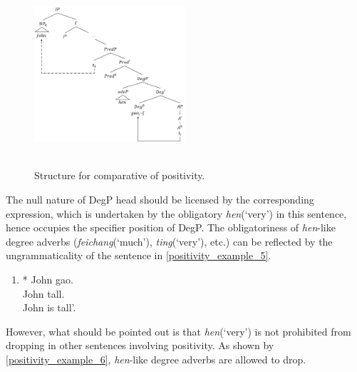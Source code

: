 \documentclass{ctexart}
\begin{document}
\begin{figure}[H]
    \centering
    \includegraphics[width=0.5\textwidth]{Pic/positive_structure.png}
    \begin{caption}
        \\ \vspace{-1.1ex}
        Structure for comparative of positivity.
    \end{caption}
\end{figure}

The null nature of DegP head should be licensed by the corresponding expression, which is undertaken by the obligatory \textit{hen}(`very') in this sentence, hence occupies the specifier position of DegP. The obligatoriness of \textit{hen}-like degree adverbs (\textit{feichang}(`much'), \textit{ting}(`very'), etc.) can be reflected by the ungrammaticality of the sentence in \ref{positivity_example_5}.

\begin{enumerate}
    \item \label{positivity_example_5}
    * John gao.  \\
    \hspace*{0.5em} John tall. \\
    \hspace*{0.5em} John is tall'.
\end{enumerate}

However, what should be pointed out is that \textit{hen}(`very') is not prohibited from dropping in other sentences involving positivity. As shown by \ref{positivity_example_6}, \textit{hen}-like degree adverbs are allowed to drop.
\end{document}
